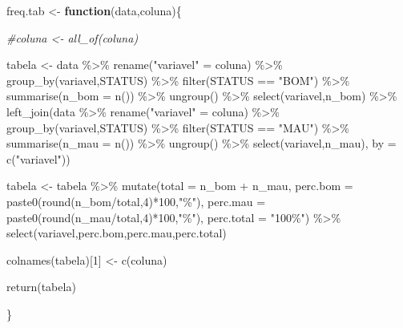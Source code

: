 \documentclass[
]{book}
\newenvironment{Shaded}{\begin{snugshade}}{\end{snugshade}}
\newcommand{\AttributeTok}[1]{\textcolor[rgb]{0.77,0.63,0.00}{#1}}
\newcommand{\CommentTok}[1]{\textcolor[rgb]{0.56,0.35,0.01}{\textit{#1}}}
\newcommand{\ControlFlowTok}[1]{\textcolor[rgb]{0.13,0.29,0.53}{\textbf{#1}}}
\newcommand{\DecValTok}[1]{\textcolor[rgb]{0.00,0.00,0.81}{#1}}
\newcommand{\FunctionTok}[1]{\textcolor[rgb]{0.00,0.00,0.00}{#1}}
\newcommand{\NormalTok}[1]{#1}
\newcommand{\OtherTok}[1]{\textcolor[rgb]{0.56,0.35,0.01}{#1}}
\newcommand{\SpecialCharTok}[1]{\textcolor[rgb]{0.00,0.00,0.00}{#1}}
\newcommand{\StringTok}[1]{\textcolor[rgb]{0.31,0.60,0.02}{#1}}
\begin{document}
\begin{Shaded}
\begin{Highlighting}[]
\NormalTok{freq.tab }\OtherTok{\textless{}{-}} \ControlFlowTok{function}\NormalTok{(data,coluna)\{}
  
  \CommentTok{\#coluna \textless{}{-} all\_of(coluna)}
  
\NormalTok{  tabela }\OtherTok{\textless{}{-}}\NormalTok{ data }\SpecialCharTok{\%\textgreater{}\%}
    \FunctionTok{rename}\NormalTok{(}\StringTok{"variavel"} \OtherTok{=}\NormalTok{ coluna) }\SpecialCharTok{\%\textgreater{}\%}
    \FunctionTok{group\_by}\NormalTok{(variavel,STATUS) }\SpecialCharTok{\%\textgreater{}\%}
    \FunctionTok{filter}\NormalTok{(STATUS }\SpecialCharTok{==} \StringTok{"BOM"}\NormalTok{) }\SpecialCharTok{\%\textgreater{}\%}
    \FunctionTok{summarise}\NormalTok{(}\AttributeTok{n\_bom =} \FunctionTok{n}\NormalTok{()) }\SpecialCharTok{\%\textgreater{}\%}
    \FunctionTok{ungroup}\NormalTok{() }\SpecialCharTok{\%\textgreater{}\%}
    \FunctionTok{select}\NormalTok{(variavel,n\_bom) }\SpecialCharTok{\%\textgreater{}\%}
    \FunctionTok{left\_join}\NormalTok{(data }\SpecialCharTok{\%\textgreater{}\%}
                \FunctionTok{rename}\NormalTok{(}\StringTok{"variavel"} \OtherTok{=}\NormalTok{ coluna) }\SpecialCharTok{\%\textgreater{}\%}
                \FunctionTok{group\_by}\NormalTok{(variavel,STATUS) }\SpecialCharTok{\%\textgreater{}\%}
                \FunctionTok{filter}\NormalTok{(STATUS }\SpecialCharTok{==} \StringTok{"MAU"}\NormalTok{) }\SpecialCharTok{\%\textgreater{}\%}
                \FunctionTok{summarise}\NormalTok{(}\AttributeTok{n\_mau =} \FunctionTok{n}\NormalTok{()) }\SpecialCharTok{\%\textgreater{}\%}
                \FunctionTok{ungroup}\NormalTok{() }\SpecialCharTok{\%\textgreater{}\%}
                \FunctionTok{select}\NormalTok{(variavel,n\_mau), }\AttributeTok{by =} \FunctionTok{c}\NormalTok{(}\StringTok{"variavel"}\NormalTok{))}
  
\NormalTok{  tabela }\OtherTok{\textless{}{-}}\NormalTok{ tabela }\SpecialCharTok{\%\textgreater{}\%}
    \FunctionTok{mutate}\NormalTok{(}\AttributeTok{total =}\NormalTok{ n\_bom }\SpecialCharTok{+}\NormalTok{ n\_mau,}
           \AttributeTok{perc.bom =} \FunctionTok{paste0}\NormalTok{(}\FunctionTok{round}\NormalTok{(n\_bom}\SpecialCharTok{/}\NormalTok{total,}\DecValTok{4}\NormalTok{)}\SpecialCharTok{*}\DecValTok{100}\NormalTok{,}\StringTok{"\%"}\NormalTok{),}
           \AttributeTok{perc.mau =} \FunctionTok{paste0}\NormalTok{(}\FunctionTok{round}\NormalTok{(n\_mau}\SpecialCharTok{/}\NormalTok{total,}\DecValTok{4}\NormalTok{)}\SpecialCharTok{*}\DecValTok{100}\NormalTok{,}\StringTok{"\%"}\NormalTok{),}
           \AttributeTok{perc.total =} \StringTok{"100\%"}\NormalTok{) }\SpecialCharTok{\%\textgreater{}\%}
    \FunctionTok{select}\NormalTok{(variavel,perc.bom,perc.mau,perc.total)}
  
  \FunctionTok{colnames}\NormalTok{(tabela)[}\DecValTok{1}\NormalTok{] }\OtherTok{\textless{}{-}} \FunctionTok{c}\NormalTok{(coluna)}
  
  \FunctionTok{return}\NormalTok{(tabela)}
  
\NormalTok{\}}
\end{Highlighting}
\end{Shaded}
\end{document}
